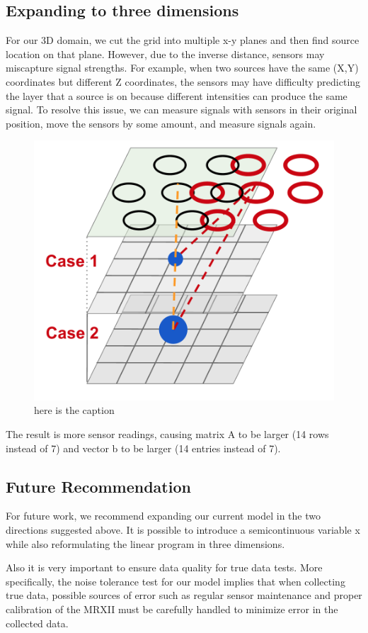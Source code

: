 \documentclass[a4paper]{article}
\begin{document}
\subsection*{Expanding to three dimensions}
For our 3D domain, we cut the grid into multiple x-y planes and then find source location on that plane. However, due to the inverse distance, sensors may miscapture signal strengths. For example, when two sources have the same (X,Y) coordinates but different Z coordinates, the sensors may have difficulty predicting the layer that a source is on because different intensities can produce the same signal. 
To resolve this issue, we can measure signals with sensors in their original position, move the sensors by some amount, and measure signals again. 

\begin{figure}[H]
\centering
\includegraphics[width=.6\textwidth]{3d_model_fig.png}
\caption{here is the caption}
\label{Figure 10}
\end{figure}

The result is more sensor readings, causing matrix A to be larger (14 rows instead of 7) and vector b to be larger (14 entries instead of 7). 

\subsection*{Future Recommendation}

For future work, we recommend expanding our current model in the two directions suggested above. It is possible to introduce a semicontinuous variable x while also reformulating the linear program in three dimensions. 

Also it is very important to ensure data quality for true data tests. More specifically, the noise tolerance test for our model implies that when collecting true data, possible sources of error such as regular sensor maintenance and proper calibration of the MRXII must be carefully handled to minimize error in the collected data.
\end{document}
